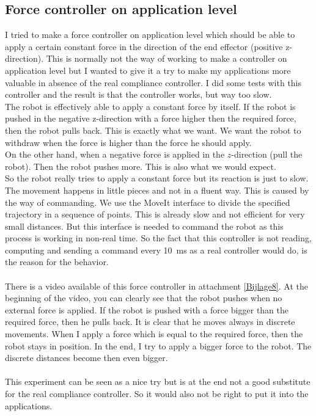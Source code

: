 \documentclass[11pt,a4paper]{report}
\begin{document}
\subsection{Force controller on application level}
I tried to make a force controller on application level which should be able to apply a certain constant force in the direction of the end effector (positive z-direction). This is normally not the way of working to make a controller on application level but I wanted to give it a try to make my applications more valuable in absence of the real compliance controller. I did some tests with this controller and the result is that the controller works, but way too slow.\\
The robot is effectively able to apply a constant force by itself.
If the robot is pushed in the negative z-direction with a force higher then the required force, then the robot pulls back. This is exactly what we want. We want the robot to withdraw when the force is higher than the force he should apply.
\\On the other hand, when a negative force is applied in the $z$-direction (pull the robot). Then the robot pushes more. This is also what we would expect.
\\So the robot really tries to apply a constant force but its reaction is just to slow. The movement happens in little pieces and not in a fluent way. This is caused by the way of commanding. We use the MoveIt interface to divide the specified trajectory in a sequence of points. This is already slow and not efficient for very small distances. But this interface is needed to command the robot as this process is working in non-real time. So the fact that this controller is not reading, computing and sending a command every 10~ms as a real controller would do, is the reason for the behavior.
\\\\
There is a video available of this force controller in attachment \ref{Bijlage8}. At the beginning of the video, you can clearly see that the robot pushes when no external force is applied. If the robot is pushed with a force bigger than the required force, then he pulls back. It is clear that he moves always in discrete movements. When I apply a force which is equal to the required force, then the robot stays in position. In the end, I try to apply a bigger force to the robot. The discrete distances become then even bigger. \\\\
This experiment can be seen as a nice try but is at the end not a good substitute for the real compliance controller. So it would also not be right to put it into the applications.
\newpage
\end{document}
